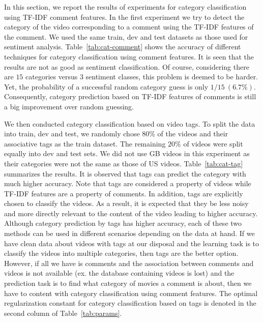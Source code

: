 In this section, we report the results of experiments for category classification using TF-IDF comment features. In the first experiment we try to detect the category of the video corresponding to a comment using the TF-IDF features of the comment.  We used the same train, dev and test datasets as those used for sentiment analysis. Table~\ref{tab:cat-comment} shows the accuracy of different techniques for category classification using comment features. It is seen that the results are not as good as sentiment classification. Of course, considering there are $15$ categories versus $3$ sentiment classes, this problem is deemed to be harder. Yet, the probability of a successful random category guess is only $1/15 \: (6.7\%)$. Consequently, category prediction based on TF-IDF features of comments is still a big improvement over random guessing.

We then conducted category classification based on video tags. To split the data into train, dev and test, we randomly chose $80\%$ of the videos and their associative tags as the train dataset. The remaining $20\%$ of videos were split equally into dev and test sets. We did not use GB videos in this experiment as their categories were not the same as those of US videos.
Table~\ref{tab:cat-tag} summarizes the results. It is observed that tags can predict the category with much higher accuracy. Note that tags are considered a property of videos while TF-IDF features are a property of comments. In addition, tags are explicitly chosen to classify the videos. As a result, it is expected that they be less noisy and more directly relevant to the content of the video leading to higher accuracy.
Although category prediction by tags has higher accuracy, each of these two methods can be used in different scenarios depending on the data at hand. If we have clean data about videos with tags at our disposal and the learning task is to classify the videos into multiple categories, then tags are the better option. However, if all we have is comments and the association between comments and videos is not available (ex. the database containing videos is lost) and the prediction task is to find what category of movies a comment is about, then we have to content with category classification using comment features. The optimal regularization constant for category classification based on tags is denoted in the second column of Table~\ref{tab:params}.

